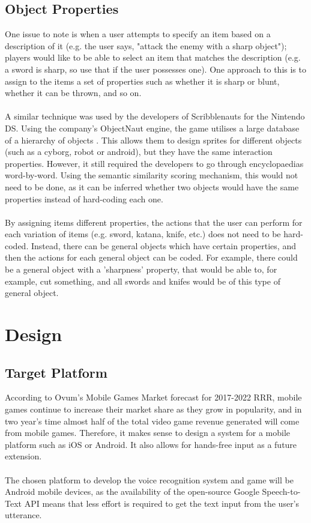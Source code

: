 \documentclass[12pt]{article}
\begin{document}
\subsection{Object Properties}

One issue to note is when a user attempts to specify an item based on a description of it (e.g. the user says, "attack the enemy with a sharp object"); players would like to be able to select an item that matches the description (e.g. a sword is sharp, so use that if the user possesses one). One approach to this is to assign to the items a set of properties such as whether it is sharp or blunt, whether it can be thrown, and so on.
\\
\\
A similar technique was used by the developers of Scribblenauts for the Nintendo DS. Using the company's ObjectNaut engine, the game utilises a large database of a hierarchy of objects \cite{RefWorks:48}. This allows them to design sprites for different objects (such as a cyborg, robot or android), but they have the same interaction properties. However, it still required the developers to go through encyclopaedias word-by-word. Using the semantic similarity scoring mechanism, this would not need to be done, as it can be inferred whether two objects would have the same properties instead of hard-coding each one.
\\
\\
By assigning items different properties, the actions that the user can perform for each variation of items (e.g. sword, katana, knife, etc.) does not need to be hard-coded. Instead, there can be general objects which have certain properties, and then the actions for each general object can be coded. For example, there could be a general object with a 'sharpness' property, that would be able to, for example, cut something, and all swords and knifes would be of this type of general object.
\newpage

\section{Design}
\subsection{Target Platform}

According to Ovum's Mobile Games Market forecast for 2017-2022 RRR, mobile games continue to increase their market share as they grow in popularity, and in two year's time almost half of the total video game revenue generated will come from mobile games. Therefore, it makes sense to design a system for a mobile platform such as iOS or Android.  It also allows for hands-free input as a future extension.
\\
\\
The chosen platform to develop the voice recognition system and game will be Android mobile devices, as the availability of the open-source Google Speech-to-Text API means that less effort is required to get the text input from the user's utterance.
\end{document}
